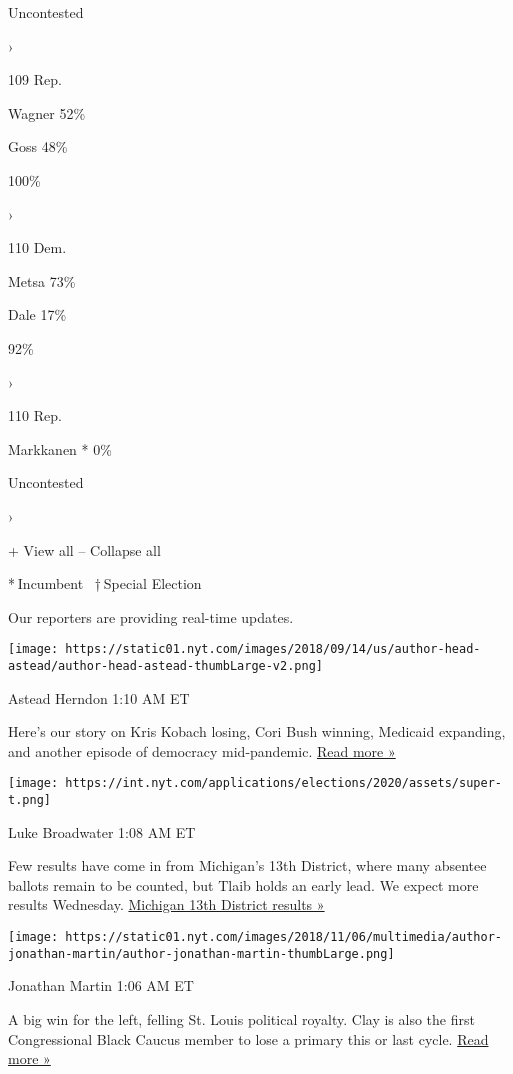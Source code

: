 Uncontested

›

109 Rep.

 Wagner 52\%

 Goss 48\%

100\%

›

110 Dem.

 Metsa 73\%

 Dale 17\%

92\%

›

110 Rep.

 Markkanen * 0\%

Uncontested

›

+ View all -- Collapse all

* Incumbent~ † Special Election

Our reporters are providing real-time updates.

\texttt{[image: https://static01.nyt.com/images/2018/09/14/us/author-head-astead/author-head-astead-thumbLarge-v2.png]}

Astead Herndon 1:10 AM ET

Here's our story on Kris Kobach losing, Cori Bush winning, Medicaid
expanding, and another episode of democracy mid-pandemic.
\href{https://www.nytimes.com/2020/08/04/us/politics/kobach-tlaib.html?action=click\&module=ELEX_results\&pgtype=Interactive\&region=ReporterUpdates}{Read
more »}

\texttt{[image: https://int.nyt.com/applications/elections/2020/assets/super-t.png]}

Luke Broadwater 1:08 AM ET

Few results have come in from Michigan's 13th District, where many
absentee ballots remain to be counted, but Tlaib holds an early lead. We
expect more results Wednesday.
\href{https://www.nytimes.com/interactive/2020/08/04/us/elections/results-michigan-house-district-13-primary-election.html?action=click\&module=ELEX_results\&pgtype=Interactive\&region=ReporterUpdates}{Michigan
13th District results »}

\texttt{[image: https://static01.nyt.com/images/2018/11/06/multimedia/author-jonathan-martin/author-jonathan-martin-thumbLarge.png]}

Jonathan Martin 1:06 AM ET

A big win for the left, felling St. Louis political royalty. Clay is
also the first Congressional Black Caucus member to lose a primary this
or last cycle.
\href{https://www.nytimes.com/2020/08/05/us/politics/cori-bush-missouri-william-lacy-clay.html?action=click\&module=ELEX_results\&pgtype=Interactive\&region=ReporterUpdates}{Read
more »}

